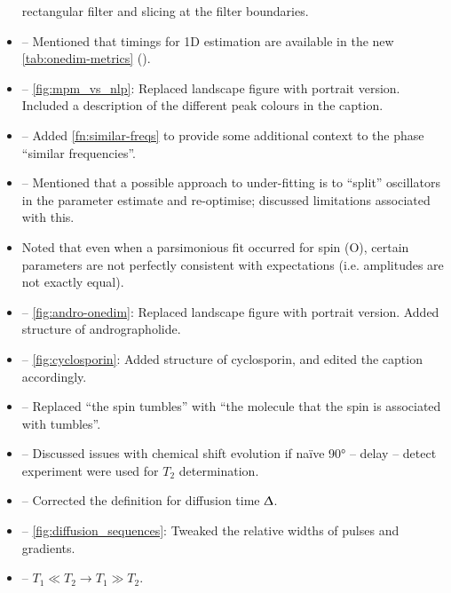 \documentclass[12pt]{article}
\begin{document}
\begin{itemize}
            rectangular filter and slicing at the filter boundaries.
        \item {} -- Mentioned that timings for 1D
            estimation are available in the new \cref{tab:onedim-metrics}
            ().
        \item {} -- \cref{fig:mpm_vs_nlp}: Replaced
            landscape figure with portrait version. Included a description of the
            different peak colours in the caption.
        \item {} -- Added \cref{fn:similar-freqs} to
            provide some additional context to the phase ``similar frequencies''.
        \item {} -- Mentioned that a possible approach
            to under-fitting is to ``split'' oscillators in the parameter
            estimate and re-optimise; discussed limitations associated with
            this.
        \item {} Noted that even when a parsimonious fit
            occurred for spin (O), certain parameters are not perfectly consistent
            with expectations (i.e. amplitudes are not exactly equal).
        \item {} -- \cref{fig:andro-onedim}: Replaced
            landscape figure with portrait version. Added structure of andrographolide.
        \item {} -- \cref{fig:cyclosporin}: Added structure of
            cyclosporin, and edited the caption accordingly.
        \item {} -- Replaced ``the spin tumbles''
            with ``the molecule that the spin is associated with tumbles''.
        \item {} -- Discussed issues with chemical shift
            evolution if na\"ive \ang{90} -- delay -- detect experiment were
            used for $T_2$ determination.
        \item {} -- Corrected the definition for
            diffusion time $\Updelta$.
        \item {} -- \cref{fig:diffusion_sequences}:
            Tweaked the relative widths of pulses and gradients.
       \item {} -- $T_1 \ll T_2 \rightarrow T_1 \gg T_2$.

\end{itemize}
\end{document}
